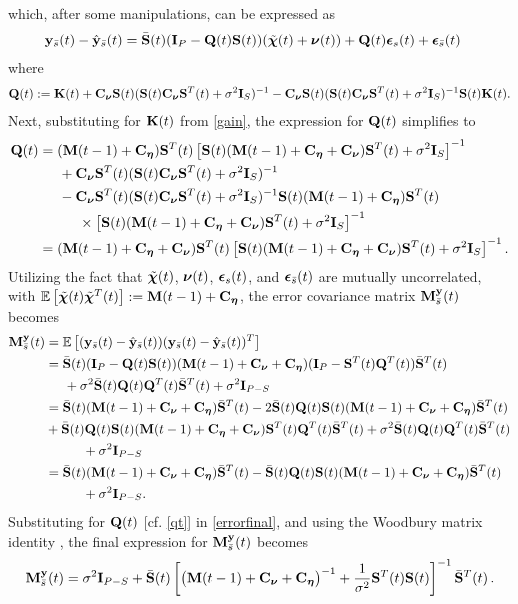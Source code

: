 \documentclass[draftcls,onecolumn,12pt]{IEEEtran}
\def \ybt {{\b{y}_{\bar{s}}(t)}}
\def \yh {{\hat{\b{y}}_{\bar{s}}}}
\def \nut {{\bs{\nu}(t)}}
\def \epst {{\bs{\epsilon}_s(t)}}
\def \epsbt {{\bs{\epsilon}_{\bar{s}}(t)}}
\def \Exp {\mathbb{E}}
\def \tc {{\tilde{\bs{\chi}}(t)}}
\def \My {{\b{M}^{\b{y}}_{\bar{s}}(t)}}
\def \Kt {{\b{K}(t)}}
\def \ceta {{\b{C}_{\bs{\eta}}}}
\def \si  {{\sigma^2\b{I}_S}}
\def \sib  {{\sigma^2\b{I}_{P-S}}}
\def \cnu {{\b{C}_{\bs{\nu}}}}
\def \St {{\b{S}(t)}}
\def \Stt {{\b{S}^T(t)}}
\def \Sb {{\bar{\b{S}}(t)}}
\def \Sbt {{\bar{\b{S}}^T(t)}}
\theoremstyle{plain}\newtheorem{thm}{Theorem}
\theoremstyle{definition}
\theoremstyle{remark}
\begin{document}
which, after some manipulations, can be expressed as
\begin{align}
\ybt-\yh(t) &= \Sb(\b{I}_P - \b{Q}(t)\St)(\tc+\nut) + \b{Q}(t)\epst + \epsbt \label{err3}
\end{align} 
where 
\begin{align}
\b{Q}(t):=\Kt + \cnu\St(\St\cnu\Stt+\si)^{-1} - \cnu\St(\St\cnu\Stt+\si)^{-1}\St\Kt.
\end{align}
Next, substituting for $\Kt$ from \eqref{gain}, the expression for $\mathbf{Q}(t)$  simplifies to
\begin{align}
\b{Q}(t) &= (\b{M}(t-1)+\ceta)\Stt\left[\St(\b{M}(t-1)+\ceta+\cnu)\Stt +\si\right]^{-1} \nonumber\\
&\hspace{0.5cm}+ \cnu\Stt(\St\cnu\Stt+\si)^{-1} \nonumber\\ &\hspace{0.5cm}-\cnu\Stt(\St\cnu\Stt+\si)^{-1}\St(\b{M}(t-1)+\ceta)\Stt \nonumber\\
&\hspace{1cm} \times \left[\St(\b{M}(t-1)+\ceta+\cnu)\Stt+\si\right]^{-1} \\
&= (\b{M}(t-1)+\ceta + \cnu)\Stt\left[\St(\b{M}(t-1)+\ceta+\cnu)\Stt+\si\right]^{-1}. \label{qt}
\end{align}
Utilizing the fact that $\tc$, $\nut$, $\epst$, and $\epsbt$ are mutually uncorrelated, with $\E{\tc\tilde{\bs{\chi}}^T(t)}:=\b{M}(t-1)+\ceta$, the error covariance matrix $\My$ becomes
\begin{align}
\My &= \Exp\left[(\ybt-\yh(t))(\ybt-\yh(t))^T\right] \\
&= \Sb(\b{I}_P - \b{Q}(t)\St)(\b{M}(t-1) + \cnu + \ceta)(\b{I}_P - \Stt\b{Q}^T(t))\Sbt \nonumber\\
&\hspace{0.5cm}+ \sigma^2\Sb\b{Q}(t)\b{Q}^T(t)\Sbt + \sib\\
&= \Sb(\b{M}(t-1) + \cnu + \ceta)\Sbt - 2\Sb\b{Q}(t)\St(\b{M}(t-1) + \cnu + \ceta)\Sbt \nonumber\\ 
&\hspace{0.0cm}+ \Sb\b{Q}(t)\St(\b{M}(t-1) + \ceta + \cnu)\Stt\b{Q}^T(t)\Sbt + \sigma^2\Sb\b{Q}(t)\b{Q}^T(t)\Sbt \nonumber\\
&\hspace{1cm}+ \sib\\
&= \Sb(\b{M}(t-1) + \cnu + \ceta)\Sbt - \Sb\b{Q}(t)\St(\b{M}(t-1) + \cnu + \ceta)\Sbt \nonumber\\
&\hspace{1cm}+ \sib. \label{errorfinal}
\end{align}
Substituting for $\mathbf{Q}(t)$ [cf. \eqref{qt}] in \eqref{errorfinal}, and using the Woodbury matrix identity \cite{golub}, the final expression for $\mathbf{M}^{\mathbf{y}}_{\bar{s}}(t)$ becomes
\begin{align}
\My  = \sib + \Sb\left[\big(\b{M}(t-1) + \cnu + \ceta\big)^{-1} + \frac{1}{\sigma^2}\Stt\St\right]^{-1}\Sbt\,.
\end{align}
\end{document}
